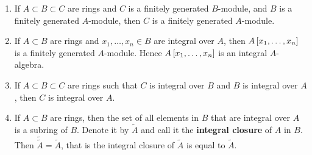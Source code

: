 \begin{lemma}
\label{lem:14.3}
\hfill
\begin{enumerate}
\item If $ A \subset B \subset C $ are rings and $ C $ is a finitely generated $ B $-module, and $ B $ is a finitely generated $ A $-module, then $ C $ is a finitely generated $ A $-module.
\item If $ A \subset B $ are rings and $ x_1, \dots, x_n \in B $ are integral over $ A $, then $ A\sbr{x_1, \dots, x_n} $ is a finitely generated $ A $-module. Hence $ A\sbr{x_1, \dots, x_n} $ is an integral $ A $-algebra.
\item If $ A \subset B \subset C $ are rings such that $ C $ is integral over $ B $ and $ B $ is integral over $ A $, then $ C $ is integral over $ A $.
\item If $ A \subset B $ are rings, then the set of all elements in $ B $ that are integral over $ A $ is a subring of $ B $. Denote it by $ \widetilde{A} $ and call it the \textbf{integral closure} of $ A $ in $ B $. Then $ \widetilde{\widetilde{A}} = \widetilde{A} $, that is the integral closure of $ \widetilde{A} $ is equal to $ \widetilde{A} $.
\end{enumerate}
\end{lemma}

\pagebreak

